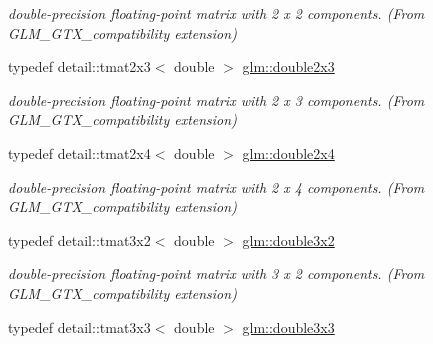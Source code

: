 \begin{DoxyCompactItemize}
\begin{DoxyCompactList}\small\item\em double-\/precision floating-\/point matrix with 2 x 2 components. (From G\+L\+M\+\_\+\+G\+T\+X\+\_\+compatibility extension) \end{DoxyCompactList}\item 
\hypertarget{group__gtx__compatibility_ga27ac5442d07853a6b0192710c1973179}{}typedef detail\+::tmat2x3$<$ double $>$ \hyperlink{group__gtx__compatibility_ga27ac5442d07853a6b0192710c1973179}{glm\+::double2x3}\label{group__gtx__compatibility_ga27ac5442d07853a6b0192710c1973179}

\begin{DoxyCompactList}\small\item\em double-\/precision floating-\/point matrix with 2 x 3 components. (From G\+L\+M\+\_\+\+G\+T\+X\+\_\+compatibility extension) \end{DoxyCompactList}\item 
\hypertarget{group__gtx__compatibility_gaecbe4a54a7014479763c6283822381ff}{}typedef detail\+::tmat2x4$<$ double $>$ \hyperlink{group__gtx__compatibility_gaecbe4a54a7014479763c6283822381ff}{glm\+::double2x4}\label{group__gtx__compatibility_gaecbe4a54a7014479763c6283822381ff}

\begin{DoxyCompactList}\small\item\em double-\/precision floating-\/point matrix with 2 x 4 components. (From G\+L\+M\+\_\+\+G\+T\+X\+\_\+compatibility extension) \end{DoxyCompactList}\item 
\hypertarget{group__gtx__compatibility_gaa63b8b04b65add448ec0837a34642c24}{}typedef detail\+::tmat3x2$<$ double $>$ \hyperlink{group__gtx__compatibility_gaa63b8b04b65add448ec0837a34642c24}{glm\+::double3x2}\label{group__gtx__compatibility_gaa63b8b04b65add448ec0837a34642c24}

\begin{DoxyCompactList}\small\item\em double-\/precision floating-\/point matrix with 3 x 2 components. (From G\+L\+M\+\_\+\+G\+T\+X\+\_\+compatibility extension) \end{DoxyCompactList}\item 
\hypertarget{group__gtx__compatibility_gaba7b74a9b22f06708140da823030823c}{}typedef detail\+::tmat3x3$<$ double $>$ \hyperlink{group__gtx__compatibility_gaba7b74a9b22f06708140da823030823c}{glm\+::double3x3}\label{group__gtx__compatibility_gaba7b74a9b22f06708140da823030823c}


\end{DoxyCompactItemize}
